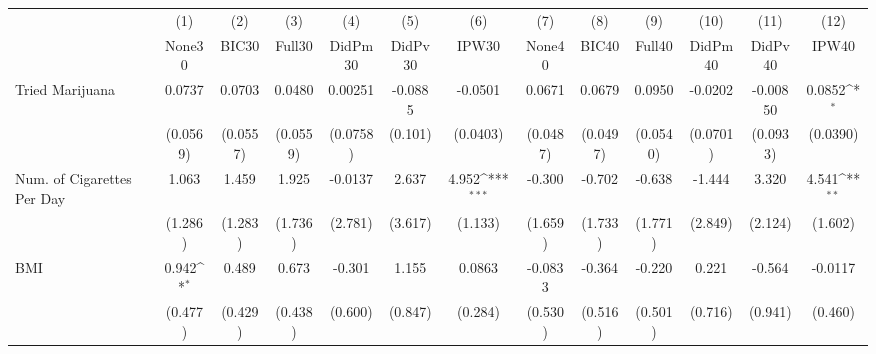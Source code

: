 {
\def\sym#1{\ifmmode^{#1}\else\(^{#1}\)\fi}
\begin{tabular}{l*{12}{c}}
\toprule
            &\multicolumn{1}{c}{(1)}&\multicolumn{1}{c}{(2)}&\multicolumn{1}{c}{(3)}&\multicolumn{1}{c}{(4)}&\multicolumn{1}{c}{(5)}&\multicolumn{1}{c}{(6)}&\multicolumn{1}{c}{(7)}&\multicolumn{1}{c}{(8)}&\multicolumn{1}{c}{(9)}&\multicolumn{1}{c}{(10)}&\multicolumn{1}{c}{(11)}&\multicolumn{1}{c}{(12)}\\
            &\multicolumn{1}{c}{None30}&\multicolumn{1}{c}{BIC30}&\multicolumn{1}{c}{Full30}&\multicolumn{1}{c}{DidPm30}&\multicolumn{1}{c}{DidPv30}&\multicolumn{1}{c}{IPW30}&\multicolumn{1}{c}{None40}&\multicolumn{1}{c}{BIC40}&\multicolumn{1}{c}{Full40}&\multicolumn{1}{c}{DidPm40}&\multicolumn{1}{c}{DidPv40}&\multicolumn{1}{c}{IPW40}\\
\midrule
Tried Marijuana&      0.0737         &      0.0703         &      0.0480         &     0.00251         &     -0.0885         &     -0.0501         &      0.0671         &      0.0679         &      0.0950         &     -0.0202         &    -0.00850         &      0.0852\sym{*}  \\
            &    (0.0569)         &    (0.0557)         &    (0.0559)         &    (0.0758)         &     (0.101)         &    (0.0403)         &    (0.0487)         &    (0.0497)         &    (0.0540)         &    (0.0701)         &    (0.0933)         &    (0.0390)         \\
\addlinespace
Num. of Cigarettes Per Day&       1.063         &       1.459         &       1.925         &     -0.0137         &       2.637         &       4.952\sym{***}&      -0.300         &      -0.702         &      -0.638         &      -1.444         &       3.320         &       4.541\sym{**} \\
            &     (1.286)         &     (1.283)         &     (1.736)         &     (2.781)         &     (3.617)         &     (1.133)         &     (1.659)         &     (1.733)         &     (1.771)         &     (2.849)         &     (2.124)         &     (1.602)         \\
\addlinespace
BMI         &       0.942\sym{*}  &       0.489         &       0.673         &      -0.301         &       1.155         &      0.0863         &     -0.0833         &      -0.364         &      -0.220         &       0.221         &      -0.564         &     -0.0117         \\
            &     (0.477)         &     (0.429)         &     (0.438)         &     (0.600)         &     (0.847)         &     (0.284)         &     (0.530)         &     (0.516)         &     (0.501)         &     (0.716)         &     (0.941)         &     (0.460)         \\

\end{tabular}}
